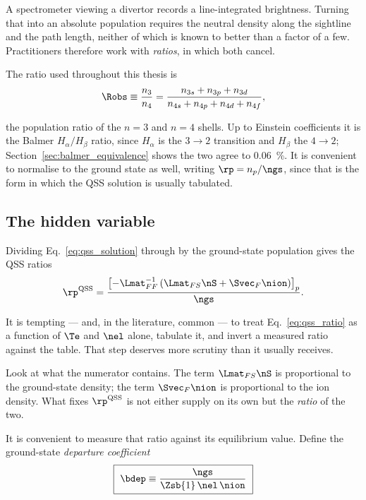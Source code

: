 A spectrometer viewing a divertor records a line-integrated brightness. Turning
that into an absolute population requires the neutral density along the
sightline and the path length, neither of which is known to better than a factor
of a few. Practitioners therefore work with \emph{ratios}, in which both cancel.

The ratio used throughout this thesis is
\begin{equation}
  \Robs \equiv \frac{n_3}{n_4}
  = \frac{n_{3s}+n_{3p}+n_{3d}}{n_{4s}+n_{4p}+n_{4d}+n_{4f}},
  \label{eq:observable_def}
\end{equation}

\noindent the population ratio of the $n=3$ and $n=4$ shells. Up to Einstein
coefficients it is the Balmer $H_\alpha/H_\beta$ ratio, since $H_\alpha$ is the
$3\to2$ transition and $H_\beta$ the $4\to2$;
Section~\ref{sec:balmer_equivalence} shows the two agree to
\SI{0.06}{\percent}. It is convenient to normalise to the ground state as well,
writing $\rp = n_p/\ngs$, since that is the form in which the QSS solution is
usually tabulated.

\subsection{The hidden variable}

Dividing Eq.~\eqref{eq:qss_solution} through by the ground-state population
gives the QSS ratios
\begin{equation}
  \rp^{\mathrm{QSS}}
  = \frac{\left[-\Lmat_{FF}^{-1}\left(\Lmat_{FS}\nS + \Svec_F\nion\right)\right]_p}
         {\ngs}.
  \label{eq:qss_ratio}
\end{equation}

It is tempting --- and, in the literature, common --- to treat
Eq.~\eqref{eq:qss_ratio} as a function of $\Te$ and $\nel$ alone, tabulate it,
and invert a measured ratio against the table. That step deserves more scrutiny
than it usually receives.

Look at what the numerator contains. The term $\Lmat_{FS}\nS$ is proportional to
the ground-state density; the term $\Svec_F\nion$ is proportional to the ion
density. What fixes $\rp^{\mathrm{QSS}}$ is not either supply on its own but the
\emph{ratio} of the two.

It is convenient to measure that ratio against its equilibrium value. Define the
ground-state \emph{departure coefficient}
\begin{equation}
  \boxed{\ \bdep \equiv \frac{\ngs}{\Zsb{1}\,\nel\,\nion}\ }
  \label{eq:departure}
\end{equation}

